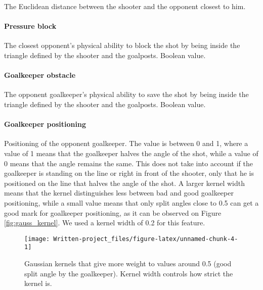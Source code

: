 \documentclass[]{article}
\let\oldparagraph\paragraph
\renewcommand{\paragraph}[1]{\oldparagraph{#1}\mbox{}}
\begin{document}
The Euclidean distance between the shooter and the opponent closest to
him.

\hypertarget{pressure-block}{%
\paragraph{Pressure block}\label{pressure-block}}

The closest opponent's physical ability to block the shot by being
inside the triangle defined by the shooter and the goalposts. Boolean
value.

\hypertarget{goalkeeper-obstacle}{%
\paragraph{Goalkeeper obstacle}\label{goalkeeper-obstacle}}

The opponent goalkeeper's physical ability to save the shot by being
inside the triangle defined by the shooter and the goalposts. Boolean
value.

\hypertarget{goalkeeper-positioning}{%
\paragraph{Goalkeeper positioning}\label{goalkeeper-positioning}}

Positioning of the opponent goalkeeper. The value is between 0 and 1,
where a value of 1 means that the goalkeeper halves the angle of the
shot, while a value of 0 means that the angle remains the same. This
does not take into account if the goalkeeper is standing on the line or
right in front of the shooter, only that he is positioned on the line
that halves the angle of the shot. A larger kernel width means that the
kernel distinguishes less between bad and good goalkeeper positioning,
while a small value means that only split angles close to 0.5 can get a
good mark for goalkeeper positioning, as it can be observed on Figure
\ref{fig:gauss_kernel}. We used a kernel width of 0.2 for this feature.

\begin{figure}[!h]

{\centering \texttt{[image: Written-project\_files/figure-latex/unnamed-chunk-4-1]} 

}

\caption{\label{fig:gauss_kernel} Gaussian kernels that give more weight to values around 0.5 (good split angle by the goalkeeper). Kernel width controls how strict the kernel is.}\label{fig:unnamed-chunk-4}
\end{figure}
\end{document}
